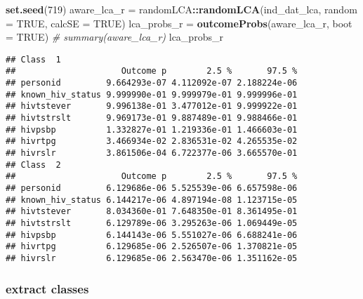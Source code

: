\documentclass[
]{article}
\newenvironment{Shaded}{\begin{snugshade}}{\end{snugshade}}
\newcommand{\CommentTok}[1]{\textcolor[rgb]{0.56,0.35,0.01}{\textit{#1}}}
\newcommand{\DataTypeTok}[1]{\textcolor[rgb]{0.13,0.29,0.53}{#1}}
\newcommand{\DecValTok}[1]{\textcolor[rgb]{0.00,0.00,0.81}{#1}}
\newcommand{\KeywordTok}[1]{\textcolor[rgb]{0.13,0.29,0.53}{\textbf{#1}}}
\newcommand{\NormalTok}[1]{#1}
\newcommand{\OperatorTok}[1]{\textcolor[rgb]{0.81,0.36,0.00}{\textbf{#1}}}
\newcommand{\OtherTok}[1]{\textcolor[rgb]{0.56,0.35,0.01}{#1}}
\newcommand{\StringTok}[1]{\textcolor[rgb]{0.31,0.60,0.02}{#1}}
\begin{document}
\begin{Shaded}
\begin{Highlighting}[]
\KeywordTok{set.seed}\NormalTok{(}\DecValTok{719}\NormalTok{)}
\NormalTok{aware_lca_r =}\StringTok{ }\NormalTok{randomLCA}\OperatorTok{::}\KeywordTok{randomLCA}\NormalTok{(ind_dat_lca, }\DataTypeTok{random =} \OtherTok{TRUE}\NormalTok{, }\DataTypeTok{calcSE =} \OtherTok{TRUE}\NormalTok{)}
\NormalTok{lca_probs_r =}\StringTok{ }\KeywordTok{outcomeProbs}\NormalTok{(aware_lca_r, }\DataTypeTok{boot =} \OtherTok{TRUE}\NormalTok{)}
\CommentTok{# summary(aware_lca_r)}
\NormalTok{lca_probs_r}
\end{Highlighting}
\end{Shaded}

\begin{verbatim}
## Class  1 
##                     Outcome p        2.5 %       97.5 %
## personid         9.664293e-07 4.112092e-07 2.188224e-06
## known_hiv_status 9.999990e-01 9.999979e-01 9.999996e-01
## hivtstever       9.996138e-01 3.477012e-01 9.999922e-01
## hivtstrslt       9.969173e-01 9.887489e-01 9.988466e-01
## hivpsbp          1.332827e-01 1.219336e-01 1.466603e-01
## hivrtpg          3.466934e-02 2.836531e-02 4.265535e-02
## hivrslr          3.861506e-04 6.722377e-06 3.665570e-01
## Class  2 
##                     Outcome p        2.5 %       97.5 %
## personid         6.129686e-06 5.525539e-06 6.657598e-06
## known_hiv_status 6.144217e-06 4.897194e-08 1.123715e-05
## hivtstever       8.034360e-01 7.648350e-01 8.361495e-01
## hivtstrslt       6.129789e-06 3.295263e-06 1.069449e-05
## hivpsbp          6.144143e-06 5.551027e-06 6.688241e-06
## hivrtpg          6.129685e-06 2.526507e-06 1.370821e-05
## hivrslr          6.129685e-06 2.563470e-06 1.351162e-05
\end{verbatim}

\hypertarget{extract-classes}{%
\subsubsection{extract classes}\label{extract-classes}}

\begin{Shaded}
\end{Shaded}
\end{document}
